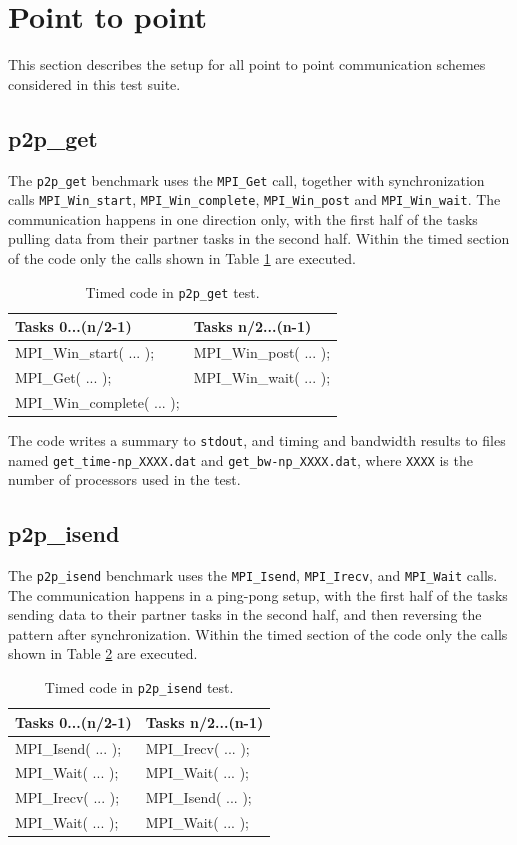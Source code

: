 \documentclass[10pt,a4paper]{report}
\begin{document}
\section{Point to point}
This section describes the setup for all point to point communication schemes considered in this test suite.

\subsection{p2p\_get}
The \verb+p2p_get+ benchmark uses the \verb+MPI_Get+ call, together with synchronization calls \verb+MPI_Win_start+, \verb+MPI_Win_complete+, \verb+MPI_Win_post+ and \verb+MPI_Win_wait+. The communication happens in one direction only, with the first half of the tasks pulling data from their partner tasks in the second half. Within the timed section of the code only the calls shown in Table \ref{tab:get} are executed.

\begin{table}[ht]
\centering
\caption{Timed code in \texttt{p2p\_get} test.}
\label{tab:get}
\begin{tabular}{|l|l|}
\hline
\bf{Tasks 0...(n/2-1)}	   & \bf{Tasks n/2...(n-1)}\\\hline
MPI\_Win\_start( ... );    & MPI\_Win\_post( ... );\\
MPI\_Get( ... );           & MPI\_Win\_wait( ... );\\
MPI\_Win\_complete( ... ); & \\\hline
\end{tabular}
\end{table}

The code writes a summary to \verb+stdout+, and timing and bandwidth results to files named \verb+get_time-np_XXXX.dat+ and \verb+get_bw-np_XXXX.dat+, where \verb+XXXX+ is the number of processors used in the test.

\FloatBarrier
\subsection{p2p\_isend}
The \verb+p2p_isend+ benchmark uses the \verb+MPI_Isend+, \verb+MPI_Irecv+, and \verb+MPI_Wait+ calls. The communication happens in a ping-pong setup, with the first half of the tasks sending data to their partner tasks in the second half, and then reversing the pattern after synchronization. Within the timed section of the code only the calls shown in Table \ref{tab:isend} are executed.

\begin{table}[ht]
\centering
\caption{Timed code in \texttt{p2p\_isend} test.}
\label{tab:isend}
\begin{tabular}{|l|l|}
\hline
\bf{Tasks 0...(n/2-1)}	& \bf{Tasks n/2...(n-1)}\\\hline
MPI\_Isend( ... );      & MPI\_Irecv( ... );\\
MPI\_Wait( ... );       & MPI\_Wait( ... );\\
MPI\_Irecv( ... );      & MPI\_Isend( ... );\\
MPI\_Wait( ... );       & MPI\_Wait( ... );\\\hline
\end{tabular}
\end{table}
\end{document}
